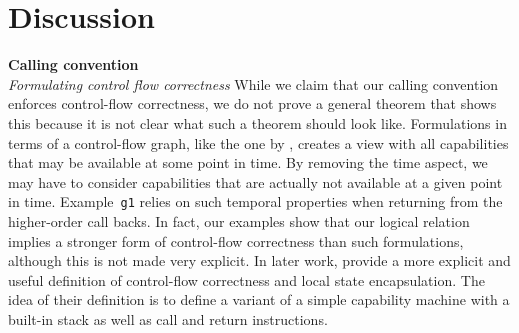 \documentclass[format=acmsmall, review=true, screen=true]{acmart}
\newcommand{\itoplas}[1]{#1}
\newcommand{\itoplassug}[1]{}
\begin{document}
\section{Discussion}
\label{sec:discussion}
\itoplassug{Reviewer C, esop, would have liked a discussion of (a) what could be done on a machine with a smaller set of capabilities, e.g., no local capability (we could probably not have done anything as the stack pointer could be stored on the heap and reused at unintended times.) and (b) what could be done with a larger/stronger set of available capabilities (we could include a discussion of linear capabilities).}
\itoplassug{Reviewer C, esop, asks whether our attacker model is reasonable (see tex comment). Maybe we should include a short discussion of the attacker model.}
\itoplassug{Should we include a discussion of how this ``scales'' to other things like a multi-core setting or if we needed tail calls?}
\noindent\textbf{Calling convention}\\
\emph{Formulating control flow correctness} While we claim that our calling convention enforces control-flow correctness, we do not prove a general theorem that shows this because it is not clear what such a theorem should look like.
Formulations in terms of a control-flow graph, like the one by \citet{abadi_control-flow_2005}, \itoplas{creates a view with all capabilities that may be available at some point in time.
By removing the time aspect, we may have to consider capabilities that are actually not available at a given point in time.
  Example~\texttt{g1} relies on such temporal properties when returning from the higher-order call backs.}
In fact, our examples show that our logical relation implies a stronger form of control-flow correctness than such formulations, although this is not made very explicit.
In later work, \citet{skorstengaard_stktokens_2019} provide a more explicit and useful definition of control-flow correctness and local state encapsulation.
The idea of their definition is to define a variant of a simple capability machine with a built-in stack as well as call and return instructions.
\end{document}
